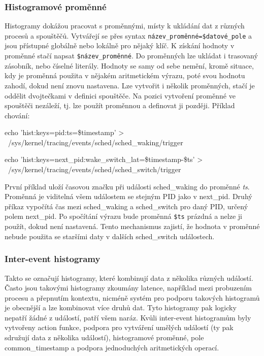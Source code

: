 \subsubsection*{Histogramové proměnné}

Histogramy dokážou pracovat s proměnnými, místy k ukládání dat z různých procesů a spouštěčů. Vytvářejí se přes syntax \texttt{název\_proměnné=\$datové\_pole} a jsou přístupné globálně nebo lokálně pro nějaký klíč. K získání hodnoty v proměnné stačí napsat \texttt{\$název\_proměnné}. Do proměnných lze ukládat i trasovaný zásobník, nebo číselné literály. Hodnoty se samy od sebe nemění, kromě situace, kdy je proměnná použita v nějakém aritmetickém výrazu, poté svou hodnotu zahodí, dokud není znovu nastavena. Lze vytvořit i několik proměnných, stačí je oddělit dvojtečkami v definici spouštěče. Na pozici vytvoření proměnné ve spouštěči nezáleží, tj. lze použít proměnnou a definovat ji později. Příklad chování:
\begin{code}
echo 'hist:keys=pid:ts=\$timestamp' > \
/sys/kernel/tracing/events/sched/sched\_waking/trigger

echo 'hist:keys=next_pid:wake_switch_lat=\$timestamp-\$ts' > \
/sys/kernel/tracing/events/sched/sched\_switch/trigger
\end{code}
První příklad uloží časovou značku při události sched\_waking do proměnné \emph{ts}. Proměnná je viditelná všem událostem se stejným PID jako v next\_pid. Druhý příkaz vypočítá čas mezi sched\_waking a sched\_switch pro daný PID, určený polem next\_pid. Po spočítání výrazu bude proměnná \texttt{\$ts} prázdná a nelze ji použít, dokud není nastavená. Tento mechanismus zajistí, že hodnota v proměnné nebude použita se staršími daty v dalších sched\_switch událostech.

\subsubsection*{Inter-event histogramy}

Takto se označují histogramy, které kombinují data z několika různých událostí. Často jsou takovými histogramy zkoumány latence, například mezi probuzením procesu a přepnutím kontextu, nicméně systém pro podporu takových histogramů je obecnější a lze kombinovat více druhů dat. Tyto histogramy pak logicky nepatří žádné z událostí, patří všem naráz. Kvůli inter-event histogramům byly vytvořeny action funkce, podpora pro vytváření umělých událostí (ty pak sdružují data z několika událostí), histogramové proměnné, pole common\_timestamp a podpora jednoduchých aritmetických operací.

